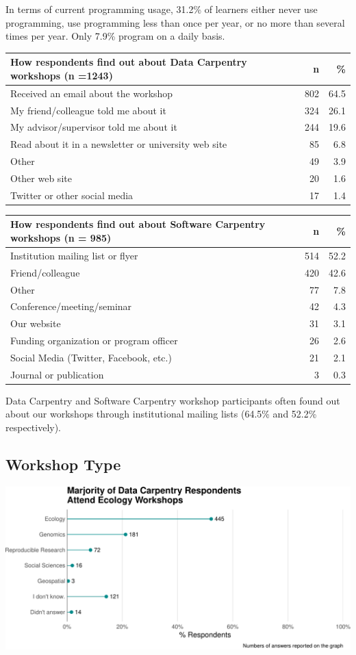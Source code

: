 \documentclass[]{article}
\makeatletter
\def\maxwidth{\ifdim\Gin@nat@width>\linewidth\linewidth\else\Gin@nat@width\fi}
\makeatother
\begin{document}
In terms of current programming usage, 31.2\% of learners either never
use programming, use programming less than once per year, or no more
than several times per year. Only 7.9\% program on a daily basis.

\begin{longtable}[]{@{}lrr@{}}
\toprule
How respondents find out about Data Carpentry workshops (n =1243) & n &
\%\tabularnewline
\midrule
\endhead
Received an email about the workshop & 802 & 64.5\tabularnewline
My friend/colleague told me about it & 324 & 26.1\tabularnewline
My advisor/supervisor told me about it & 244 & 19.6\tabularnewline
Read about it in a newsletter or university web site & 85 &
6.8\tabularnewline
Other & 49 & 3.9\tabularnewline
Other web site & 20 & 1.6\tabularnewline
Twitter or other social media & 17 & 1.4\tabularnewline
\bottomrule
\end{longtable}

\begin{longtable}[]{@{}lrr@{}}
\toprule
How respondents find out about Software Carpentry workshops (n = 985) &
n & \%\tabularnewline
\midrule
\endhead
Institution mailing list or flyer & 514 & 52.2\tabularnewline
Friend/colleague & 420 & 42.6\tabularnewline
Other & 77 & 7.8\tabularnewline
Conference/meeting/seminar & 42 & 4.3\tabularnewline
Our website & 31 & 3.1\tabularnewline
Funding organization or program officer & 26 & 2.6\tabularnewline
Social Media (Twitter, Facebook, etc.) & 21 & 2.1\tabularnewline
Journal or publication & 3 & 0.3\tabularnewline
\bottomrule
\end{longtable}

Data Carpentry and Software Carpentry workshop participants often found
out about our workshops through institutional mailing lists (64.5\% and
52.2\% respectively).

\subsection{Workshop Type}\label{workshop-type}

\includegraphics[width=\maxwidth]{../figures/dc-workshop-type-plot-1}
\end{document}
